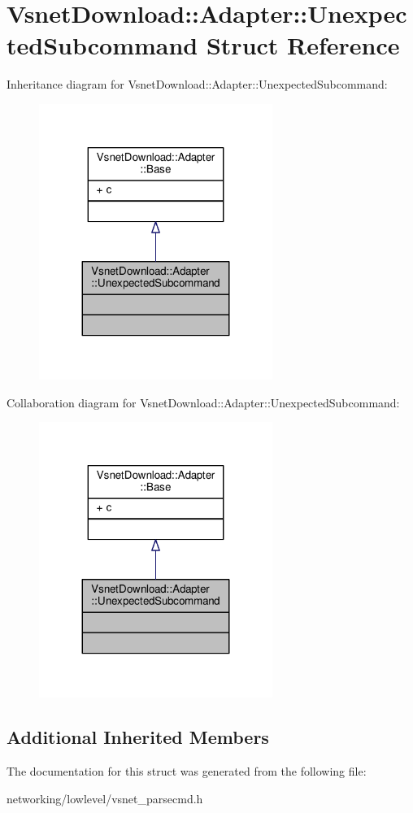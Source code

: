 \hypertarget{structVsnetDownload_1_1Adapter_1_1UnexpectedSubcommand}{}\section{Vsnet\+Download\+:\+:Adapter\+:\+:Unexpected\+Subcommand Struct Reference}
\label{structVsnetDownload_1_1Adapter_1_1UnexpectedSubcommand}


Inheritance diagram for Vsnet\+Download\+:\+:Adapter\+:\+:Unexpected\+Subcommand\+:
\nopagebreak
\begin{figure}[H]
\begin{center}
\leavevmode
\includegraphics[width=215pt]{dd/dff/structVsnetDownload_1_1Adapter_1_1UnexpectedSubcommand__inherit__graph}
\end{center}
\end{figure}


Collaboration diagram for Vsnet\+Download\+:\+:Adapter\+:\+:Unexpected\+Subcommand\+:
\nopagebreak
\begin{figure}[H]
\begin{center}
\leavevmode
\includegraphics[width=215pt]{d1/d81/structVsnetDownload_1_1Adapter_1_1UnexpectedSubcommand__coll__graph}
\end{center}
\end{figure}
\subsection*{Additional Inherited Members}


The documentation for this struct was generated from the following file\+:\begin{DoxyCompactItemize}
\item 
networking/lowlevel/vsnet\+\_\+parsecmd.\+h\end{DoxyCompactItemize}
